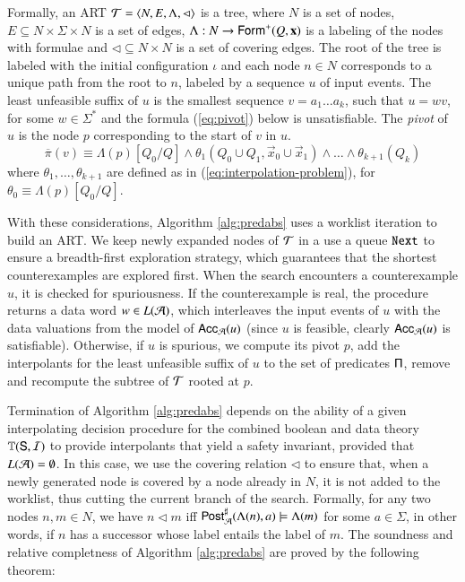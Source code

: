 \documentclass[10pt,conference,letterpaper,twocolumn]{IEEEtran}
\begin{document}
Formally, an ART $\mathcal{T} = \left\langle N,E,\Lambda,\lhd \right\rangle$ is a tree, where
$N$ is a set of nodes, $E \subseteq N \times \Sigma \times N$ is a set
of edges, $\Lambda : N \rightarrow \mathsf{Form}^+(Q,\mathbf x)$ is a labeling
of the nodes with formulae and $\lhd \subseteq N \times N$ is a set
of covering edges. The root of the tree is labeled with the initial
configuration $\iota$ and each node $n \in N$ corresponds to a unique
path from the root to $n$, labeled by a sequence $u$ of input
events. The least unfeasible suffix of $u$ is the smallest sequence $v
= a_1 \ldots a_k$, such that $u = wv$, for some $w \in \Sigma^*$ and
the formula (\ref{eq:pivot}) below is unsatisfiable. The \emph{pivot}
of $u$ is the node $p$ corresponding to the start of $v$ in $u$.
\begin{equation}\label{eq:pivot}
  \overline{\pi}(v) \equiv \Lambda(p)[Q_0/Q] \wedge
  \theta_1(Q_0 \cup Q_1,\vec{x}_0 \cup \vec{x}_1) \wedge \ldots \wedge
  \theta_{k+1}(Q_k)
\end{equation}
where $\theta_1,\ldots,\theta_{k+1}$ are defined as in
(\ref{eq:interpolation-problem}), for $\theta_0 \equiv
\Lambda(p)[Q_0/Q]$. 

With these considerations, Algorithm \ref{alg:predabs} uses a worklist
iteration to build an ART. We keep newly expanded nodes of $\mathcal{T}$ in a
use a queue $\mathtt{Next}$ to ensure a breadth-first exploration
strategy, which guarantees that the shortest counterexamples are
explored first. When the search encounters a counterexample $u$, it is
checked for spuriousness. If the counterexample is real, the procedure
returns a data word $w \in L(\mathcal{A})$, which interleaves the input events
of $u$ with the data valuations from the model of $\mathsf{Acc}_{\mathcal{A}}(u)$
(since $u$ is feasible, clearly $\mathsf{Acc}_{\mathcal{A}}(u)$ is
satisfiable). Otherwise, if $u$ is spurious, we compute its pivot $p$,
add the interpolants for the least unfeasible suffix of $u$ to the set
of predicates $\mathsf{\Pi}$, remove and recompute the subtree of $\mathcal{T}$
rooted at $p$. 

Termination of Algorithm \ref{alg:predabs} depends on the ability of a
given interpolating decision procedure for the combined boolean and
data theory $\mathbb{T}(\mathsf{S},\mathcal{I})$ to provide interpolants that yield a
safety invariant, provided that $L(\mathcal{A}) = \emptyset$. In this case, we
use the covering relation $\lhd$ to ensure that, when a newly
generated node is covered by a node already in $N$, it is not added to
the worklist, thus cutting the current branch of the search. Formally,
for any two nodes $n,m \in N$, we have $n \lhd m$ iff
${\mathsf{Post}}^\sharp_{\mathcal{A}}(\Lambda(n),a) \models \Lambda(m)$ for some $a \in
\Sigma$, in other words, if $n$ has a successor whose label entails
the label of $m$. The soundness and relative completness of Algorithm
\ref{alg:predabs} are proved by the following theorem:
\end{document}
